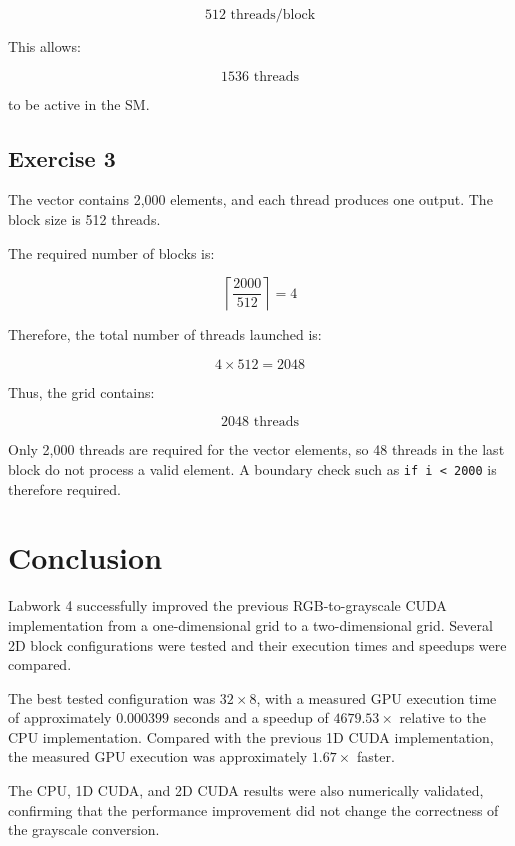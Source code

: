 \documentclass[11pt]{article}
\begin{document}
\[
\boxed{512\text{ threads/block}}
\]

This allows:

\[
\boxed{1536\text{ threads}}
\]

to be active in the SM.

\subsection{Exercise 3}

The vector contains 2,000 elements, and each thread produces one output.
The block size is 512 threads.

The required number of blocks is:

\[
\left\lceil\frac{2000}{512}\right\rceil=4
\]

Therefore, the total number of threads launched is:

\[
4\times512=2048
\]

Thus, the grid contains:

\[
\boxed{2048\text{ threads}}
\]

Only 2,000 threads are required for the vector elements, so 48 threads
in the last block do not process a valid element. A boundary check such
as \texttt{if i < 2000} is therefore required.

\section{Conclusion}

Labwork 4 successfully improved the previous RGB-to-grayscale CUDA
implementation from a one-dimensional grid to a two-dimensional grid.
Several 2D block configurations were tested and their execution times and
speedups were compared.

The best tested configuration was $32\times8$, with a measured GPU
execution time of approximately $0.000399$ seconds and a speedup of
$4679.53\times$ relative to the CPU implementation. Compared with the
previous 1D CUDA implementation, the measured GPU execution was
approximately $1.67\times$ faster.

The CPU, 1D CUDA, and 2D CUDA results were also numerically validated,
confirming that the performance improvement did not change the correctness
of the grayscale conversion.
\end{document}
